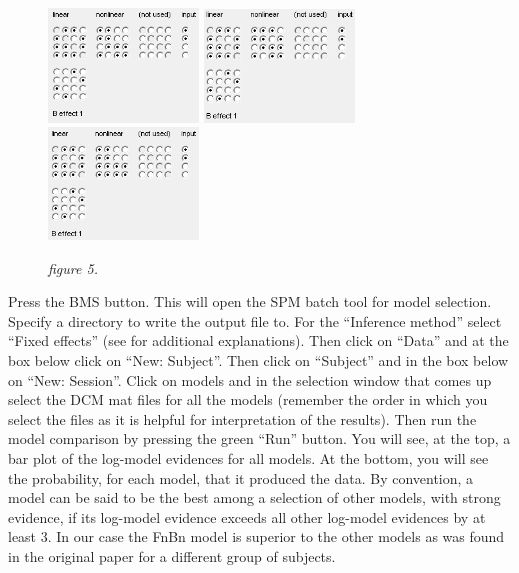 \begin{figure}
\begin{center}
\includegraphics[width=40mm]{dcm_ir/figures/figure5_FlBl}
\includegraphics[width=40mm]{dcm_ir/figures/figure5_FlBn}
\includegraphics[width=40mm]{dcm_ir/figures/figure5_FnBl}
\caption{\em  figure 5. \label{dcm-ir:fig:5}}
\end{center}
\end{figure}

Press the \textsc{BMS} button. This will open the SPM batch tool for model selection. Specify a directory to write the output file to.  For the ``Inference method'' select ``Fixed effects'' (see \cite{klaas_bms} for additional explanations). Then click on ``Data'' and at the box below click on ``New: Subject''. Then click on ``Subject'' and in the box below on ``New: Session''. Click on models and in the selection window that comes up select the DCM mat files for all the models (remember the order in which you select the files as it is helpful for interpretation of the results). Then run the model comparison by pressing the green ``Run'' button. You will see, at the top, a bar plot of the log-model evidences for all models. At the bottom, you will see the probability, for each model, that it produced the data. By convention, a model can be said to be the best among a selection of other models, with strong evidence, if its log-model evidence exceeds all other log-model evidences by at least 3. In our case the FnBn model is superior to the other models as was found in the original paper \cite{cc_asymm} for a different group of subjects. 

